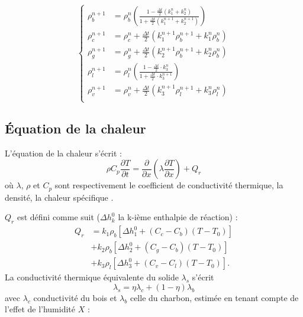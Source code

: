 \documentclass[a4paper,11pt]{article}
\begin{document}
\begin{equation}\label{eq:CK}
	\left\lbrace
		\begin{aligned}
			\rho_b^{n+1} &= \rho_b^n \left( \frac{1 - \frac{\Delta t}{2}(k_1^n + k_2^n) }{1 +\frac{\Delta t}{2}(k_1^{n+1} + k_2^{n+1}) }\right)  \\
                \rho_c^{n+1} &= \rho_c^n + \frac{\Delta t}{2} \left( k_1^{n+1} \rho_b^{n+1} + k_1^n \rho_b^n \right) \\
                \rho_g^{n+1} &= \rho_g^n + \frac{\Delta t}{2} \left( k_2^{n+1} \rho_b^{n+1} + k_2^n \rho_b^n \right) \\
                \rho_l^{n+1} &= \rho_l^n \left(\frac{ 1 - \frac{\Delta t}{2} \cdot k_3^n }{ 1 + \frac{\Delta t}{2} \cdot k_3^{n+1} }\right)  \\
                \rho_v^{n+1} &= \rho_v^n + \frac{\Delta t}{2} \left( k_3^{n+1} \rho_l^{n+1} + k_3^n \rho_l^n \right) \\
		\end{aligned}
	\right.
\end{equation}
\subsection{Équation de la chaleur}
L'équation de la chaleur s'écrit :
\begin{equation}
    \rho C_{p} \frac{\partial T}{\partial t}=\frac{\partial}{\partial x}\left(\lambda \frac{\partial T}{\partial x}\right)+Q_{r}
\end{equation}
où $\lambda$, $\rho$ et $C_p$ sont respectivement le coefficient de conductivité thermique, la densité, la chaleur spécifique .

$Q_r$ est défini comme suit ($\Delta h_k^0$ la k-ième enthalpie de réaction) :
\begin{equation}
    \begin{aligned}
Q_{r} & =k_{1} \rho_{b}\left[\Delta h_{1}^{0}+\left(C_{c}-C_{b}\right)\left(T-T_{0}\right)\right] \\
& +k_{2} \rho_{b}\left[\Delta h_{2}^{0}+\left(C_{g}-C_{b}\right)\left(T-T_{0}\right)\right] \\
& +k_{3} \rho_{l}\left[\Delta h_{3}^{0}+\left(C_{v}-C_{l}\right)\left(T-T_{0}\right)\right] .
\end{aligned}
\end{equation}
La conductivité thermique équivalente du solide $\lambda_s$ s'écrit
\begin{equation}
    \lambda_s = \eta \lambda_c + (1-\eta)\lambda_b
\end{equation}
avec $\lambda_c$ conductivité du bois et $\lambda_b$ celle du charbon, estimée en tenant compte de l'effet de l'humidité $X$ :
\end{document}
